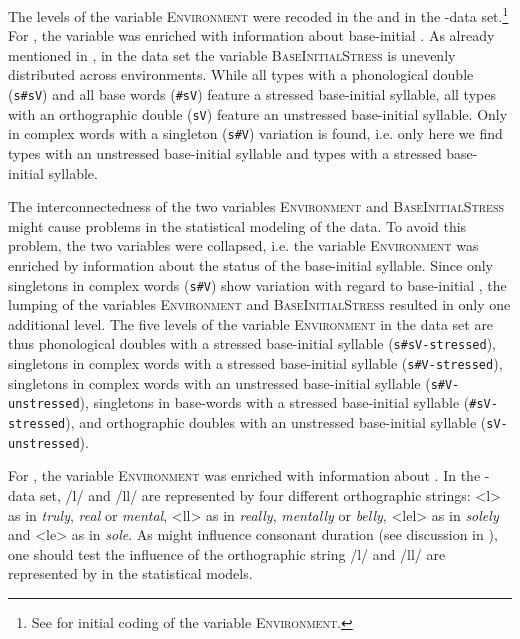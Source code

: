 The levels of the variable \textsc{Environment} were recoded in the  and in the -data set.\footnote{See  for initial coding of the variable \textsc{Environment.}} 
 For , the variable was enriched with information about base-initial . 
 As already mentioned in , in the data set the variable \textsc{BaseInitialStress} is unevenly distributed across environments.  While all types with a phonological double (\texttt{s\#sV}) and all base words (\texttt{\#sV}) feature a stressed base-initial syllable, all types with an orthographic double (\texttt{sV}) feature an unstressed base-initial syllable. Only in complex words with a singleton (\texttt{s\#V}) variation is found, i.e. only here we find types with an unstressed base-initial syllable and types with a stressed base-initial syllable. 
 
 The interconnectedness of the two variables \textsc{Environment} and \textsc{BaseInitialStress} might cause problems in  the statistical modeling of the data. To avoid this problem, the two variables were collapsed, i.e. the variable \textsc{Environment} was enriched by information about the  status of the base-initial syllable. Since only singletons in complex words (\texttt{s\#V}) show variation with regard to base-initial , the lumping of the variables \textsc{Environment} and \textsc{BaseInitialStress} resulted in only one additional level. 
 The five levels of the variable \textsc{Environment} in the data set are thus phonological doubles with a stressed base-initial syllable (\texttt{s\#sV-stressed}), singletons in complex words with a stressed base-initial syllable (\texttt{s\#V-stressed}), singletons in complex words with an unstressed base-initial syllable (\texttt{s\#V-unstressed}), singletons in base-words with a stressed base-initial syllable (\texttt{\#sV-stressed}), and orthographic doubles with an unstressed base-initial syllable (\texttt{sV-unstressed}).

 For , the variable \textsc{Environment} was enriched with information about . 
In the -data set, /l/ and /ll/ are represented by four different orthographic strings:  <l> as in \textit{truly},  \textit{real} or \textit{mental}, <ll> as in \textit{really}, \textit{mentally} or \textit{belly}, <lel> as in \textit{solely} and <le> as in \textit{sole}. As  might influence consonant duration (see discussion in ), one should test the influence of the orthographic string /l/ and /ll/ are represented by in the statistical models.






